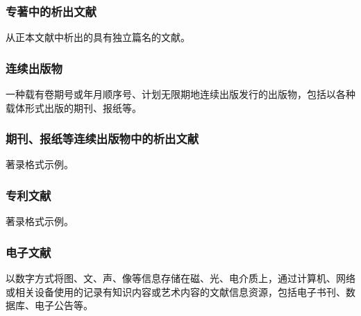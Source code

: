 \subsubsection{专著中的析出文献}

从正本文献中析出的具有独立篇名的文献。
\cite{cheng1999}

\subsubsection{连续出版物}

一种载有卷期号或年月顺序号、计划无限期地连续出版发行的出版物，包括以各种载体形式出版的期刊、报纸等。
\cite{zhong1936,zhongtu1957,aaas1883}

\subsubsection{期刊、报纸等连续出版物中的析出文献}

著录格式示例。
\cite{wang2011shu,zheng2000yun,fu2000da}

\subsubsection{专利文献}

著录格式示例。
\cite{jiang1989,xi2002}

\subsubsection{电子文献}

以数字方式将图、文、声、像等信息存储在磁、光、电介质上，通过计算机、网络或相关设备使用的记录有知识内容或艺术内容的文献信息资源，包括电子书刊、数据库、电子公告等。
\cite{oclc}
